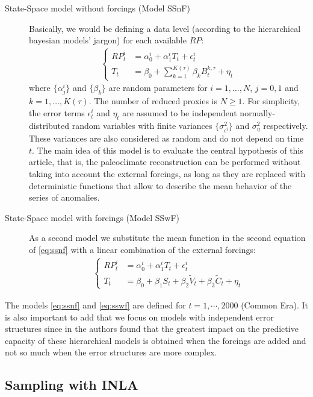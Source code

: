 \documentclass[11pt]{amsart}
\theoremstyle{plain}
\theoremstyle{definition}
\theoremstyle{remark}
\begin{document}
\begin{description}
\item[State-Space model without forcings (Model SSnF)]
Basically, we would be defining a data level (according to the hierarchical bayesian models' jargon)
  for each available $RP$:
\begin{align}\label{eq:ssnf}
  \begin{cases}
    RP_t^i&=\alpha_0^i+\alpha_1^iT_t+\epsilon^i_t\\
  T_t&=\beta_0+\sum_{k=1}^{K(\tau)}\beta_k B_t^{k,\tau}+\eta_t
  \end{cases}
\end{align}
where $\{\alpha^i_j\}$ and $\{\beta_k\}$ are random parameters for
$i=1,\ldots,N$, $j=0,1$ and $k=1,\ldots,K(\tau)$. The number of reduced proxies is
$N\geq 1$. For simplicity, the error terms
$\epsilon^i_t$ and $\eta_t$ are assumed to be
independent normally-distributed random variables with finite variances
$\{\sigma^2_{\epsilon^i}\}$ and $\sigma^2_{\eta}$ respectively. These variances
are also considered as random and do not depend on time $t$. The main idea of
this model is to evaluate the central hypothesis of this article, that is, the
paleoclimate reconstruction can be performed without taking into account the
external forcings, as long as they are replaced with deterministic
functions that allow to describe the mean behavior of the series of anomalies.
\item[State-Space model with forcings (Model SSwF)]
As a second model we substitute the mean function in the second equation of
\eqref{eq:ssnf} with a linear combination of the external forcings:    
\begin{align}\label{eq:sswf}
  \begin{cases}
    RP_t^i&=\alpha_0^i+\alpha_1^iT_t+\epsilon^i_t\\
  T_t&=\beta_0+\beta_1S_t+\beta_2\tilde V_t+\beta_3\tilde C_t+\eta_t
  \end{cases}
\end{align}
\end{description}
The models \eqref{eq:ssnf} and \eqref{eq:sswf} are defined for
$t=1,\cdots,2000$ (Common Era). It is also important to add that we focus on
models with independent error structures since in \cite{Barboza2014} the authors
found that the greatest impact on the predictive capacity of these hierarchical
models is obtained when the forcings are added and not so much when the error
structures are more complex.


\subsection{Sampling with INLA}
\end{document}
